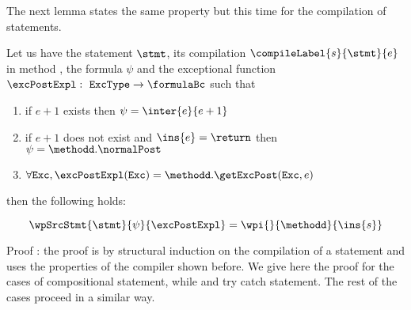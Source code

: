 The next lemma states the same property but this time for the compilation of statements.
\begin{thm}\label{relWpStmt}
     Let us have the statement $\stmt$, its compilation $\compileLabel{s}{\stmt}{e}$  in  method \methodd, the formula $\psi$
     and the exceptional   function $\excPostExpl : \mbox{ \rm \texttt{ExcType}}  \rightarrow \formulaBc $ such that 

      \begin{enumerate}
            \item if $e+1$ exists  then $\psi = \inter{e}{e+1}$
	    \item if $e+1$ does not exist and $\ins{e} = \return$ then $\psi = \methodd. \normalPost$
	    \item $\forall \mbox{\rm\texttt{Exc}} ,  \excPostExpl( \mbox{\rm\texttt{Exc}} ) = \methodd.\getExcPost(\mbox{\rm\texttt{Exc}}, e ) $ 
      \end{enumerate} then the following holds: 
  
     $$   \wpSrcStmt{\stmt}{\psi }{\excPostExpl} = \wpi{}{\methodd}{\ins{s}}$$   
\end{thm}

Proof : the proof is  by structural induction on the compilation of a statement and uses the properties of the compiler 
        shown before. We give here the proof  for the cases of compositional statement, while and try catch statement.
The rest of the cases proceed in a similar way.


